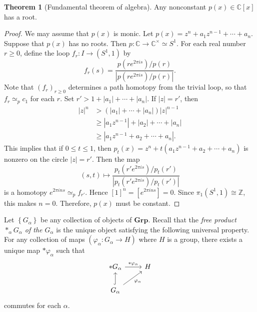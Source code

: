 \documentclass[10pt,letterpaper,cm]{nupset}
\theoremstyle{definition}
\theoremstyle{theorem}
\newtheorem{theorem}[definition]{Theorem}
\theoremstyle{remark}
\newcommand{\C}{\mathbb C}
\newcommand{\Z}{\mathbb Z}
\newcommand{\1}{\mathbb{1}}
\newcommand{\0}{\vec 0}
\begin{document}
\begin{theorem}[Fundamental theorem of algebra]
Any nonconstant $p(x) \in \C[x]$ has a root. 
\end{theorem}
\begin{proof}
We may assume that $p(x)$ is monic. Let $p(x) = z^n + a_{1}z^{n-1} +\cdots + a_n$. Suppose that $p(x)$ has no roots. Then $p : \C \to \C^{\times} \simeq S^1$. For each real number $r\geq 0$, define the loop $f_r : I \to (S^1, 1)$ by $$f_r(s) = \frac{p(re^{2\pi i s})/p(r)}{\left\lvert{p(re^{2\pi i s})/p(r)}\right\rvert}.$$ Note that $\left(f_r\right)_{r\geq 0}$ determines a path homotopy from the trivial loop, so that $f_r \simeq_p c_1$ for each $r$. Set $ r' > 1 + \left\lvert{a_1}\right\rvert + \cdots + \left\lvert{a_n}\right\rvert$. If $\left\lvert{z}\right\rvert =r'$, then 
\begin{align*}
 \left\lvert{z}\right\rvert^n & > \left(\left\lvert{a_1}\right\rvert + \cdots + \left\lvert{a_n}\right\rvert\right)\left\lvert{z}\right\rvert^{n-1} 
 \\ & \geq \left\lvert{a_1z^{n-1}}\right\rvert + \left\lvert{a_2}\right\rvert + \cdots + \left\lvert{a_n}\right\rvert\\ & \geq \left\lvert{a_1z^{n-1} + a_2 + \cdots + a_n}\right\rvert.
\end{align*}
This implies that if $0\leq t\leq 1$, then $p_t(x) = z^n +t(a_1z^{n-1} + a_2 + \cdots + a_n)$ is nonzero on the circle $\left\lvert{z}\right\rvert =r'$. Then the map $$\left(s,t\right) \mapsto \frac{p_t(r'e^{2\pi i s})/p_t(r')}{\left\lvert{p_t(r'e^{2\pi i s})/p_t(r')}\right\rvert}$$ is a homotopy $e^{2\pi i ns} \simeq_p f_{r'}$. Hence $[1]^n = \left[e^{2\pi i ns} \right] = 0$. Since $\pi_1(S^1, 1) \cong \Z$, this makes $n=0$. Therefore, $p(x)$ must be constant. 
\end{proof}

\bigskip



Let $\left\{G_{\alpha}\right\}$ be any collection of objects of $\mathbf{Grp}$. Recall that the \textit{free product $\ast_{\alpha} G_{\alpha}$ of the $G_{\alpha}$} is the unique object satisfying the following universal property.   For any collection of maps $\left(\varphi_{\alpha}: G_{\alpha} \to H\right)$ where $H$ is a group, there exists a unique map $\ast \varphi_{\alpha}$ such that
\[
\begin{tikzcd}
\ast G_{\alpha} \arrow[r, "\ast \varphi_{\alpha}"] & H \\
G_{\alpha} \arrow[ru, "\varphi_{\alpha}"'] \arrow[u, hook] & 
\end{tikzcd}
\] commutes for each $\alpha$.
\end{document}
